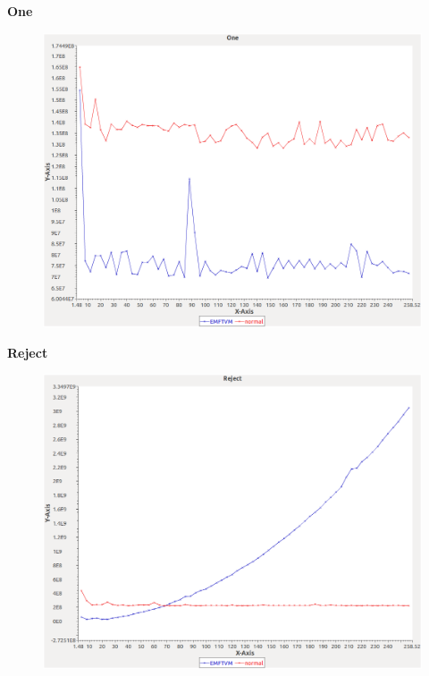 \noindent\textbf{One}

\begin{figure}[h]
\centering
\includegraphics[width=\textwidth]{graphs/set/One}
\end{figure}
\pagebreak

\noindent\textbf{Reject}

\begin{figure}[h]
\centering
\includegraphics[width=\textwidth]{graphs/set/Reject}
\end{figure}
\pagebreak


